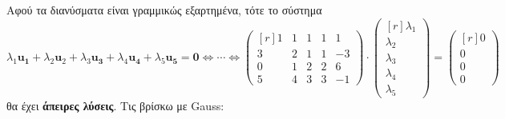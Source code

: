 Αφού τα διανύσματα είναι γραμμικώς εξαρτημένα, τότε το σύστημα
\[
  \lambda _{1} \mathbf{u_{1}}+ \lambda _{2} \mathbf{u}_{2} + \lambda _{3} \mathbf{u_{3}}+
  \lambda _{4} \mathbf{u_{4}} + \lambda _{5} \mathbf{u_{5}} = \mathbf{0} 
  \Leftrightarrow \cdots \Leftrightarrow 
  \begin{pmatrix*}[r]
    1 & 1 & 1 & 1 & 1  \\
    3 & 2 & 1 & 1 & -3 \\
    0 & 1 & 2 & 2 & 6  \\
    5 & 4 & 3 & 3 & -1
  \end{pmatrix*} \cdot 
  \begin{pmatrix*}[r] \lambda _{1} \\ \lambda _{2} \\ \lambda _{3} \\ \lambda _{4} \\
  \lambda _{5} \end{pmatrix*} = 
  \begin{pmatrix*}[r] 0 \\ 0 \\ 0 \\ 0 \end{pmatrix*}
\] 
θα έχει \textbf{άπειρες λύσεις}. Τις βρίσκω με Gauss:
